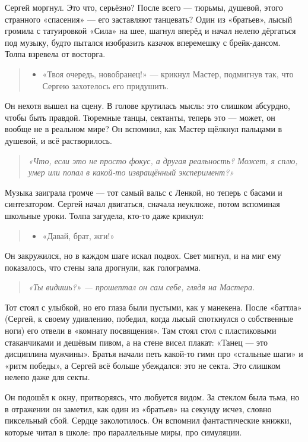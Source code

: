\documentclass[12pt,a4paper]{book}
\newenvironment{dialogue}{\begin{quote}\itshape\begin{itemize}\item[]}{\end{itemize}\end{quote}}
\newenvironment{innerthought}{\begin{quote}\small\itshape}{\end{quote}}
\begin{document}
Сергей моргнул. Это что, серьёзно? После всего --- тюрьмы, душевой, этого странного «спасения» --- его заставляют танцевать? Один из «братьев», лысый громила с татуировкой «Сила» на шее, шагнул вперёд и начал нелепо дёргаться под музыку, будто пытался изобразить казачок вперемешку с брейк-дансом. Толпа взревела от восторга.

\begin{dialogue}
«Твоя очередь, новобранец!» --- крикнул Мастер, подмигнув так, что Сергею захотелось его придушить.
\end{dialogue}

Он нехотя вышел на сцену. В голове крутилась мысль: это слишком абсурдно, чтобы быть правдой. Тюремные танцы, сектанты, теперь это --- может, он вообще не в реальном мире? Он вспомнил, как Мастер щёлкнул пальцами в душевой, и всё растворилось.

\begin{innerthought}
«Что, если это не просто фокус, а другая реальность? Может, я сплю, умер или попал в какой-то извращённый эксперимент?»
\end{innerthought}

Музыка заиграла громче --- тот самый вальс с Ленкой, но теперь с басами и синтезатором. Сергей начал двигаться, сначала неуклюже, потом вспоминая школьные уроки. Толпа загудела, кто-то даже крикнул:

\begin{dialogue}
«Давай, брат, жги!»
\end{dialogue}

Он закружился, но в каждом шаге искал подвох. Свет мигнул, и на миг ему показалось, что стены зала дрогнули, как голограмма.

\begin{innerthought}
«Ты видишь?» --- прошептал он сам себе, глядя на Мастера.
\end{innerthought}

Тот стоял с улыбкой, но его глаза были пустыми, как у манекена. После «баттла» (Сергей, к своему удивлению, победил, когда лысый споткнулся о собственные ноги) его отвели в «комнату посвящения». Там стоял стол с пластиковыми стаканчиками и дешёвым пивом, а на стене висел плакат: «Танец — это дисциплина мужчины». Братья начали петь какой-то гимн про «стальные шаги» и «ритм победы», а Сергей всё больше убеждался: это не секта. Это слишком нелепо даже для секты.

Он подошёл к окну, притворяясь, что любуется видом. За стеклом была тьма, но в отражении он заметил, как один из «братьев» на секунду исчез, словно пиксельный сбой. Сердце заколотилось. Он вспомнил фантастические книжки, которые читал в школе: про параллельные миры, про симуляции.
\end{document}
